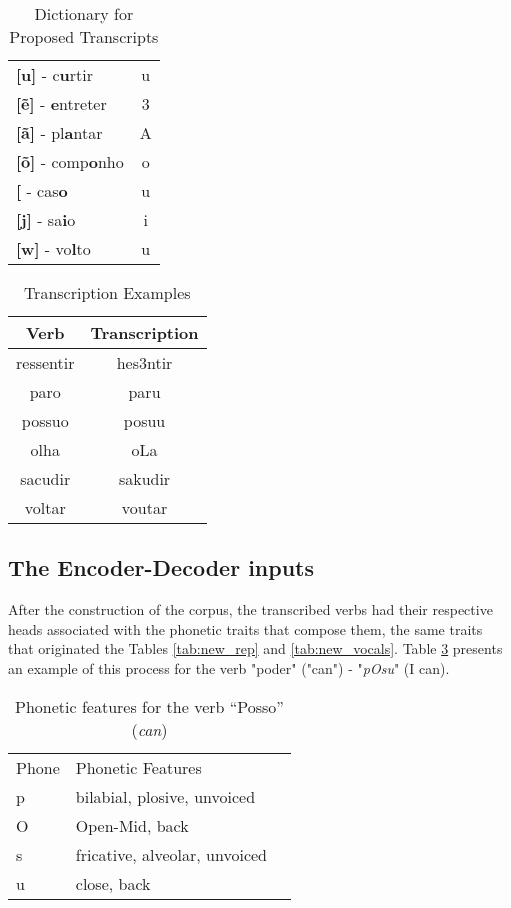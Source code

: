 \begin{table}[H]
\begin{center}
\begin{tabular}{lc}
\textbf{{[}u{]}} - c\textbf{u}rtir & u \\
\textbf{{[}\~e{]}} - \textbf{e}ntreter & 3 \\
\textbf{{[}ã{]}} - pl\textbf{a}ntar & A \\
\textbf{{[}\~o{]}} - comp\textbf{o}nho & o \\
\textbf{{[}\textupsilon{]}} - cas\textbf{o} & u \\
\textbf{{[}j{]}} - sa\textbf{i}o & i \\
\textbf{{[}w{]}} - vo\textbf{l}to & u
\end{tabular}
\end{center}
\caption{Dictionary for Proposed Transcripts}
\label{tab:chave}
\end{table}

\begin{table}[H]
\begin{center}
\begin{tabular}{cc}
\hline
\textbf{Verb} & \textbf{Transcription} \\ \hline
ressentir & hes3ntir \\
paro & paru \\
possuo & posuu \\
olha & oLa \\
sacudir & sakudir \\
voltar & voutar \\ \hline
\end{tabular}
\end{center}
\caption{Transcription Examples}
\label{tab:transc}
\end{table}






\subsection{The Encoder-Decoder inputs}
\label{sec:inputs}

After the construction of the corpus, the transcribed verbs had their respective heads associated with the phonetic traits that compose them, the same traits that originated the Tables \ref{tab:new_rep} and \ref{tab:new_vocals}. Table \ref{tab:pOsu} presents an example of this process for the verb "poder" ("can") - "\textit{pOsu}" (I can).

\begin{table}[H]
\begin{center}
\begin{tabular}{lll}
Phone & Phonetic Features &  \\ \cline{1-2}
p & bilabial, plosive, unvoiced &  \\
O & Open-Mid, back &  \\
s & fricative, alveolar, unvoiced &  \\
u & close, back & 
\end{tabular}
\end{center}
\caption{Phonetic features for the verb “Posso” (\textit{can})}
\label{tab:pOsu}
\end{table}

